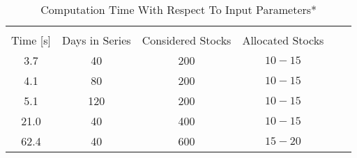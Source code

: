 

\begin{table}[ht]
\caption{Computation Time With Respect To Input Parameters*} %
\centering %
\begin{tabular}{c c c c c c} %
\hline\hline %
\\Time [s] & Days in Series & Considered Stocks & Allocated Stocks\\[0.5ex] %
\hline %
3.7 & 40 
& 200 & $10-15$\\
4.1 & 80 & 200 & $10-15$\\
5.1 & 120 & 200 & $10-15$\\
21.0 & 40 & 400 & $10-15$\\
62.4 & 40 & 600 & $15-20$\\


\hline
\end{tabular}
\label{table:tableu}
\end{table}